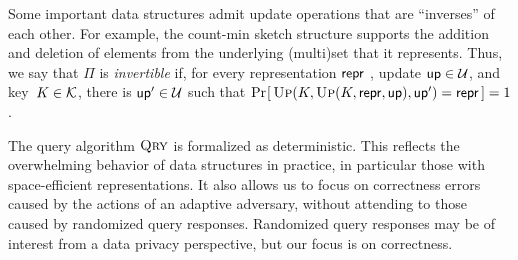 Some important data structures admit update operations that are ``inverses'' of each other.  For example, the count-min sketch structure supports the addition and deletion of elements from the underlying (multi)set that it represents.  Thus, we say that $\Pi$ is {\em invertible} if, for every representation $\mathsf{repr}$ , update $\mathsf{up} \in \mathcal{U}$, and key~$K \in \mathcal{K}$, there is $\mathsf{up}' \in \mathcal{U}$ such that $\Pr\hspace{-1pt}\left[\,\textsc{Up}(K,\textsc{Up}(K,\mathsf{repr},\mathsf{up}),\mathsf{up}') = \mathsf{repr}\,\right] = 1$.  

The query algorithm $\textsc{Qry}$ is formalized as deterministic.  This reflects the overwhelming behavior of data structures in practice, in particular those with space-efficient representations.  It also allows us to focus on correctness errors caused by the actions of an adaptive adversary, without attending to those caused by randomized query responses.  Randomized query responses may be of interest from a data privacy perspective, but our focus is on correctness.



